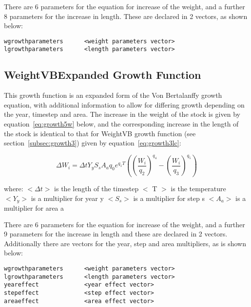 \documentclass [a4paper, 10pt]{book}
\begin{document}
\bigskip
There are 6 parameters for the equation for increase of the weight, and a further 8 parameters for the increase in length.  These are declared in 2 vectors, as shown below:

{\small\begin{verbatim}
wgrowthparameters      <weight parameters vector>
lgrowthparameters      <length parameters vector>
\end{verbatim}}

\subsection{WeightVBExpanded Growth Function}\label{subsec:growth5}
This growth function is an expanded form of the Von Bertalanffy growth equation, with additional information to allow for differing growth depending on the year, timestep and area.  The increase in the weight of the stock is given by equation~\ref{eq:growth5w} below, and the corresponding increase in the length of the stock is identical to that for WeightVB growth function (see section~\ref{subsec:growth3}) given by equation~\ref{eq:growth3lc}:

\begin{equation}\label{eq:growth5w}
\Delta W_{i} = \Delta t Y_{y} S_{s} A_{a} q_{0} e^{q_{1}T}\left(
\left( \frac{W_{i}}{q_{2}} \right)^{q_{4}} -
\left( \frac{W_{i}}{q_{3}} \right)^{q_{5}} \right)
\end{equation}

where:\newline
$<\Delta t>$ is the length of the timestep\newline
$<$ T $>$ is the temperature\newline
$<Y_{y}>$ is a multiplier for year y\newline
$<S_{s}>$ is a multiplier for step s\newline
$<A_{a}>$ is a multiplier for area a

\bigskip
There are 6 parameters for the equation for increase of the weight, and a further 9 parameters for the increase in length and these are declared in 2 vectors.  Additionally there are vectors for the year, step and area multipliers, as is shown below:

{\small\begin{verbatim}
wgrowthparameters      <weight parameters vector>
lgrowthparameters      <length parameters vector>
yeareffect             <year effect vector>
stepeffect             <step effect vector>
areaeffect             <area effect vector>
\end{verbatim}}
\end{document}
